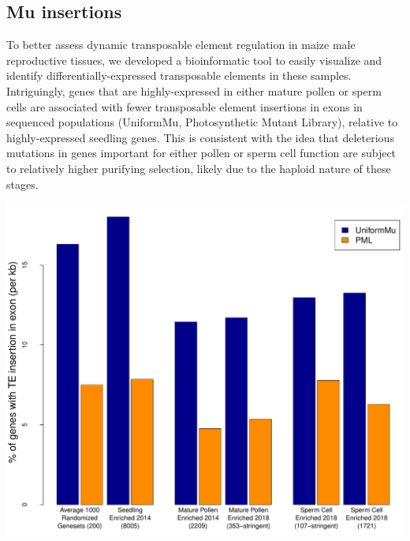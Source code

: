 \documentclass[a0,30pt]{sciposter}
\newlength{\figwidth}
\begin{document}
\begin{multicols}{3}
  \subsection*{Mu insertions}

  To better assess dynamic transposable element regulation in maize male reproductive tissues, we developed a bioinformatic tool to easily visualize and identify differentially-expressed
  transposable elements in these samples. Intriguingly, genes that are highly-expressed in either mature pollen or sperm cells are associated with fewer transposable element insertions in
  exons in sequenced populations (UniformMu, Photosynthetic Mutant Library), relative to highly-expressed seedling genes.
  This is consistent with the idea that deleterious mutations in genes important for either pollen or sperm cell function are subject to relatively higher purifying selection, likely due to the haploid 
  nature of these stages.

  \begin{center}
    \includegraphics[width=\figwidth]{rrm-barplot.pdf}
  \end{center}


\end{multicols}
\end{document}
